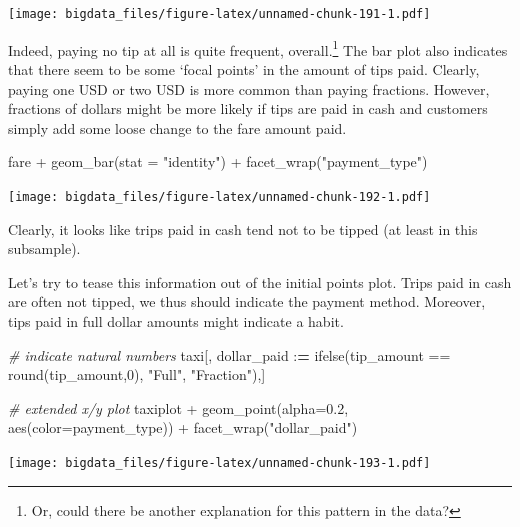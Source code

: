 \documentclass[
  12pt,
]{style/krantz}
\newenvironment{Shaded}{\begin{snugshade}}{\end{snugshade}}
\newcommand{\AttributeTok}[1]{\textcolor[rgb]{0.77,0.63,0.00}{#1}}
\newcommand{\CommentTok}[1]{\textcolor[rgb]{0.56,0.35,0.01}{\textit{#1}}}
\newcommand{\DecValTok}[1]{\textcolor[rgb]{0.00,0.00,0.81}{#1}}
\newcommand{\ErrorTok}[1]{\textcolor[rgb]{0.64,0.00,0.00}{\textbf{#1}}}
\newcommand{\FloatTok}[1]{\textcolor[rgb]{0.00,0.00,0.81}{#1}}
\newcommand{\FunctionTok}[1]{\textcolor[rgb]{0.00,0.00,0.00}{#1}}
\newcommand{\NormalTok}[1]{#1}
\newcommand{\SpecialCharTok}[1]{\textcolor[rgb]{0.00,0.00,0.00}{#1}}
\newcommand{\StringTok}[1]{\textcolor[rgb]{0.31,0.60,0.02}{#1}}
\begin{document}
\texttt{[image: bigdata\_files/figure-latex/unnamed-chunk-191-1.pdf]}

Indeed, paying no tip at all is quite frequent, overall.\footnote{Or, could there be another explanation for this pattern in the data?} The bar plot also indicates that there seem to be some `focal points' in the amount of tips paid. Clearly, paying one USD or two USD is more common than paying fractions. However, fractions of dollars might be more likely if tips are paid in cash and customers simply add some loose change to the fare amount paid.

\begin{Shaded}
\begin{Highlighting}[]
\NormalTok{fare }\SpecialCharTok{+} \FunctionTok{geom\_bar}\NormalTok{(}\AttributeTok{stat =} \StringTok{"identity"}\NormalTok{) }\SpecialCharTok{+} 
     \FunctionTok{facet\_wrap}\NormalTok{(}\StringTok{"payment\_type"}\NormalTok{) }
\end{Highlighting}
\end{Shaded}

\texttt{[image: bigdata\_files/figure-latex/unnamed-chunk-192-1.pdf]}

Clearly, it looks like trips paid in cash tend not to be tipped (at least in this subsample).

Let's try to tease this information out of the initial points plot. Trips paid in cash are often not tipped, we thus should indicate the payment method. Moreover, tips paid in full dollar amounts might indicate a habit.

\begin{Shaded}
\begin{Highlighting}[]
\CommentTok{\# indicate natural numbers}
\NormalTok{taxi[, dollar\_paid }\SpecialCharTok{:}\ErrorTok{=} \FunctionTok{ifelse}\NormalTok{(tip\_amount }\SpecialCharTok{==} \FunctionTok{round}\NormalTok{(tip\_amount,}\DecValTok{0}\NormalTok{), }\StringTok{"Full"}\NormalTok{, }\StringTok{"Fraction"}\NormalTok{),]}


\CommentTok{\# extended x/y plot}
\NormalTok{taxiplot }\SpecialCharTok{+}
     \FunctionTok{geom\_point}\NormalTok{(}\AttributeTok{alpha=}\FloatTok{0.2}\NormalTok{, }\FunctionTok{aes}\NormalTok{(}\AttributeTok{color=}\NormalTok{payment\_type)) }\SpecialCharTok{+}
     \FunctionTok{facet\_wrap}\NormalTok{(}\StringTok{"dollar\_paid"}\NormalTok{)}
\end{Highlighting}
\end{Shaded}

\texttt{[image: bigdata\_files/figure-latex/unnamed-chunk-193-1.pdf]}
\end{document}
